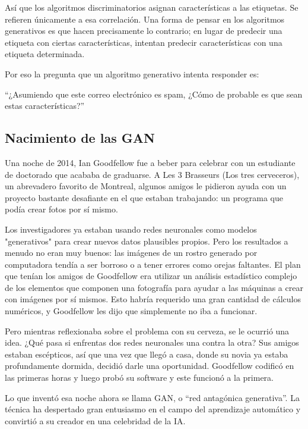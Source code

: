 \documentclass[a4paper]{article}
\begin{document}
Así que los algoritmos discriminatorios asignan características a 
las etiquetas. Se refieren únicamente a esa correlación. Una forma 
de pensar en los algoritmos generativos es que hacen precisamente 
lo contrario; en lugar de predecir una etiqueta con ciertas 
características, intentan predecir características con una 
etiqueta determinada.

Por eso la pregunta que un algoritmo generativo intenta responder 
es:

``¿Asumiendo que este correo electrónico es spam, ¿Cómo de 
probable es que sean estas características?''

\subsection{Nacimiento de las GAN}

Una noche de 2014, Ian Goodfellow fue a beber para celebrar con un 
estudiante de doctorado que acababa de graduarse. A
Les 3 Brasseurs (Los tres cerveceros), un abrevadero favorito de 
Montreal, algunos amigos le pidieron ayuda con un proyecto 
bastante desafiante en el que estaban trabajando: un programa que 
podía crear fotos por sí mismo\cite{techreview}.

Los investigadores ya estaban usando redes neuronales como
modelos "generativos" para crear nuevos datos plausibles propios. 
Pero los resultados a menudo no eran muy buenos: las imágenes de 
un rostro generado por computadora tendía a ser borroso o a tener 
errores como orejas faltantes. El plan que tenían los amigos de 
Goodfellow era utilizar un análisis estadístico complejo de los 
elementos que componen una fotografía para ayudar a las máquinas a 
crear
con imágenes por sí mismos. Esto habría requerido una gran 
cantidad de cálculos numéricos, y Goodfellow les dijo que
simplemente no iba a funcionar.

Pero mientras reflexionaba sobre el problema con su cerveza, se le 
ocurrió una idea. ¿Qué pasa si enfrentas dos redes neuronales una 
contra la otra? Sus amigos estaban escépticos, así que una vez que 
llegó a casa, donde su novia ya estaba profundamente dormida, 
decidió
darle una oportunidad. Goodfellow codificó en las primeras horas y 
luego probó su software y este funcionó a la primera.

Lo que inventó esa noche ahora se llama GAN, o ``red antagónica 
generativa''. La técnica ha despertado gran
entusiasmo en el campo del aprendizaje automático y convirtió a su 
creador en una celebridad de la IA.
\end{document}
